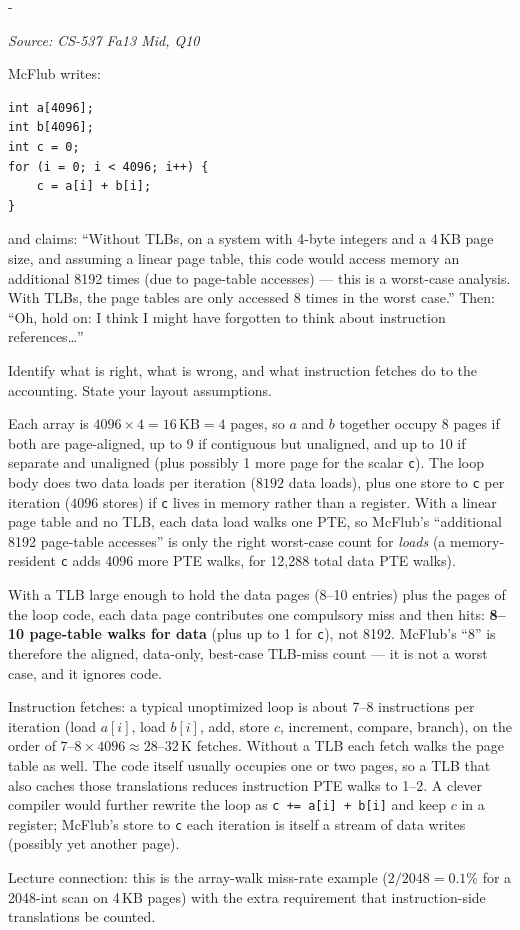 \documentclass[11pt,a4paper]{article}
\makeatletter
\newcommand{\keepspace}[1]{\par\penalty-100\begingroup
  \setlength{\dimen@}{#1}\dimen@ii\pagegoal\advance\dimen@ii-\pagetotal
  \ifdim\dimen@>\dimen@ii\ifdim\dimen@ii>\z@\vfil\fi\break\fi\endgroup}
\newcounter{qn}[section]
\newenvironment{Qn}[4]{%
  \refstepcounter{qn}\keepspace{7\baselineskip}%
  \begin{tcolorbox}[qboxstyle, title={Q\thesection.\theqn\ \ [#1 \textbar\ #2]\ \ #4}]%
  {\footnotesize\color{g3}\textit{Source: #3}}\par\smallskip%
}{%
  \end{tcolorbox}%
}
\newenvironment{Sol}{%
  \begin{tcolorbox}[sboxstyle, title={Solution}]%
}{%
  \end{tcolorbox}\vspace{0.35em}%
}
\makeatother
\begin{document}
\begin{Qn}{Medium-Hard}{Lect 13}{CS-537 Fa13 Mid, Q10}{Array-walk TLB misses, including instruction fetches}
McFlub writes:
\begin{lstlisting}[numbers=none]
int a[4096];
int b[4096];
int c = 0;
for (i = 0; i < 4096; i++) {
    c = a[i] + b[i];
}
\end{lstlisting}
and claims: ``Without TLBs, on a system with 4-byte integers and a 4\,KB
page size, and assuming a linear page table, this code would access
memory an additional 8192 times (due to page-table accesses) --- this is
a worst-case analysis. With TLBs, the page tables are only accessed 8
times in the worst case.'' Then: ``Oh, hold on: I think I might have
forgotten to think about instruction references\ldots''

Identify what is right, what is wrong, and what instruction fetches do
to the accounting. State your layout assumptions.
\end{Qn}
\begin{Sol}
Each array is $4096\times 4 = 16\,\mathrm{KB} = 4$ pages, so $a$ and $b$
together occupy 8 pages if both are page-aligned, up to 9 if contiguous
but unaligned, and up to 10 if separate and unaligned (plus possibly 1
more page for the scalar \texttt{c}). The loop body does two data loads per iteration ($8192$ data loads), plus
one store to \texttt{c} per iteration ($4096$ stores) if \texttt{c} lives in
memory rather than a register. With a linear page table and no TLB, each
data load walks one PTE, so McFlub's ``additional 8192 page-table accesses''
is only the right worst-case count for \emph{loads} (a memory-resident
\texttt{c} adds 4096 more PTE walks, for 12{,}288 total data PTE walks).

With a TLB large enough to hold the data pages (8--10 entries) plus
the pages of the loop code, each data page contributes one compulsory
miss and then hits: \textbf{8--10 page-table walks for data} (plus up
to 1 for \texttt{c}), not
8192. McFlub's ``8'' is therefore the aligned, data-only, best-case
TLB-miss count --- it is not a worst case, and it ignores code.

Instruction fetches: a typical unoptimized loop is about 7--8 instructions
per iteration (load $a[i]$, load $b[i]$, add, store $c$, increment,
compare, branch), on the order of $7\text{--}8\times 4096 \approx 28\text{--}32\,\mathrm{K}$
fetches. Without a TLB each fetch walks the page table as well. The
code itself usually occupies one or two pages, so a TLB that also
caches those translations reduces instruction PTE walks to 1--2. A
clever compiler would further rewrite the loop as
\texttt{c += a[i] + b[i]} and keep $c$ in a register; McFlub's store to
\texttt{c} each iteration is itself a stream of data writes (possibly
yet another page).

Lecture connection: this is the array-walk miss-rate example
($2/2048 = 0.1\%$ for a 2048-int scan on 4\,KB pages) with the extra
requirement that instruction-side translations be counted.
\end{Sol}
\end{document}
